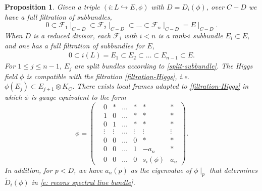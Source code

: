 \documentclass[twoside, 11pt]{article}
\numberwithin{equation}{section}
\theoremstyle{theorem}
\numberwithin{theorem}{section}
\newtheorem{proposition}[proposition]{Proposition}
\theoremstyle{definition}
\begin{document}
\medskip
\begin{proposition}\label{prop-filtration-Higgs}
Given a triple $(i:L \hookrightarrow E, \phi)$ with $D=D_i(\phi)$, over $C-D$ we have a full filtration of subbundles,
$$
0 \subset \mathcal{F}_1\mid_{C-D} \subset \mathcal{F}_2\mid_{C-D} \subset \dots \subset \mathcal{F}_n\mid_{C-D}=E\mid_{C-D}. 
$$
When $D$ is a reduced divisor, each \(\mathcal{F}_i\) with \(i<n\) is a rank-\(i\) subbundle \(E_i \subset E\), 
and one has a full filtration of subbundles for $E$, 
\begin{align}\label{filtration-Higgs}
0 \subset i(L) = E_1 \subset E_2 \subset \dots \subset E_{n-1} \subset E. 
\end{align}
For $1 \leq j \leq n-1$, $E_j$
are split bundles according to \eqref{split-subbundle}.
The Higgs field $\phi$ is compatible with the filtration \eqref{filtration-Higgs}, i.e. $\phi(E_j) \subset E_{j+1}\otimes K_C$.
There exists local frames adapted to \eqref{filtration-Higgs} in which $\phi$ is gauge equivalent to the form
\begin{equation} \label{eqn-Higgs-gauged}
    \phi = \begin{pmatrix}
        &0  &\ast &\dots &\ast &\ast &\ast  \\
        &1 &0 &\dots &\ast &\ast &\ast \\
        &0 &1 &\dots &\ast &\ast &\ast \\
        &\vdots  &\vdots &\dots &\vdots  &\vdots &\vdots \\
        &0  &0 &\dots &0 &\ast &\ast \\
        &0  &0 &\dots &1 &-a_n &\ast \\
        &0  &0 &\dots &0 &s_i(\phi) &a_n 
    \end{pmatrix}.
\end{equation}
In addition, for $p < D$, we have $a_n(p)$ as the eigenvalue 
of $\phi\mid_p$ that determines $\widetilde{D}_i(\phi)$ in \eqref{e: recons spectral line bundle}.
\end{proposition}
\end{document}
